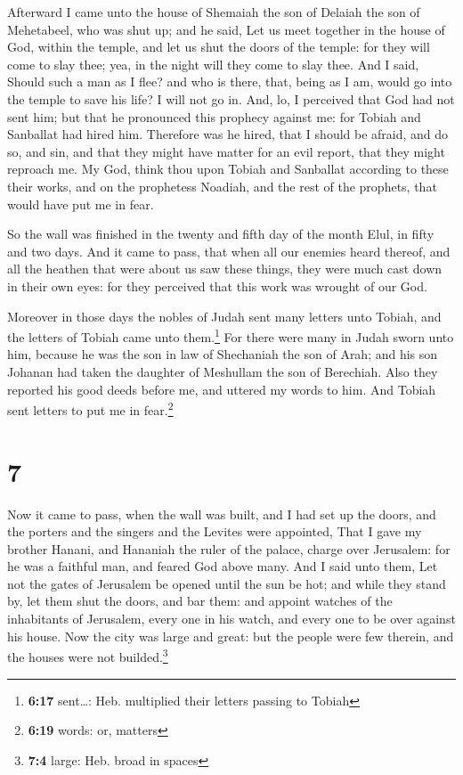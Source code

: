  Afterward I came unto the house of Shemaiah the son of
Delaiah the son of Mehetabeel, who was shut up; and he said, Let us meet
together in the house of God, within the temple, and let us shut the
doors of the temple: for they will come to slay thee; yea, in the night
will they come to slay thee.  And I said, Should such a
man as I flee? and who is there, that, being as I am, would go into the
temple to save his life? I will not go in.  And, lo, I
perceived that God had not sent him; but that he pronounced this
prophecy against me: for Tobiah and Sanballat had hired him.
 Therefore was he hired, that I should be afraid, and do
so, and sin, and that they might have matter for an evil report, that
they might reproach me.  My God, think thou upon Tobiah
and Sanballat according to these their works, and on the prophetess
Noadiah, and the rest of the prophets, that would have put me in fear.

 So the wall was finished in the twenty and fifth day of
the month Elul, in fifty and two days.  And it came to
pass, that when all our enemies heard thereof, and all the heathen that
were about us saw these things, they were much cast down in their own
eyes: for they perceived that this work was wrought of our God.

 Moreover in those days the nobles of Judah sent many
letters unto Tobiah, and the letters of Tobiah came unto
them.\footnote{\textbf{6:17} sent\ldots: Heb. multiplied their letters
  passing to Tobiah}  For there were many in Judah sworn
unto him, because he was the son in law of Shechaniah the son of Arah;
and his son Johanan had taken the daughter of Meshullam the son of
Berechiah.  Also they reported his good deeds before me,
and uttered my words to him. And Tobiah sent letters to put me in
fear.\footnote{\textbf{6:19} words: or, matters}

\hypertarget{section-6}{%
\section{7}\label{section-6}}

 Now it came to pass, when the wall was built, and I had
set up the doors, and the porters and the singers and the Levites were
appointed,  That I gave my brother Hanani, and Hananiah
the ruler of the palace, charge over Jerusalem: for he was a faithful
man, and feared God above many.  And I said unto them, Let
not the gates of Jerusalem be opened until the sun be hot; and while
they stand by, let them shut the doors, and bar them: and appoint
watches of the inhabitants of Jerusalem, every one in his watch, and
every one to be over against his house.  Now the city was
large and great: but the people were few therein, and the houses were
not builded.\footnote{\textbf{7:4} large: Heb. broad in spaces}

